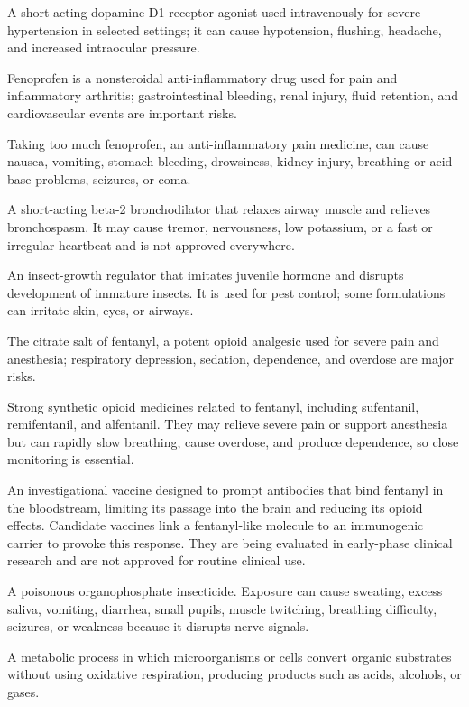  A short-acting dopamine D1-receptor agonist used intravenously for severe hypertension in selected settings; it can cause hypotension, flushing, headache, and increased intraocular pressure.

 Fenoprofen is a nonsteroidal anti-inflammatory drug used for pain and inflammatory arthritis; gastrointestinal bleeding, renal injury, fluid retention, and cardiovascular events are important risks.

 Taking too much fenoprofen, an anti-inflammatory pain medicine, can cause nausea, vomiting, stomach bleeding, drowsiness, kidney injury, breathing or acid-base problems, seizures, or coma.

 A short-acting beta-2 bronchodilator that relaxes airway muscle and relieves bronchospasm. It may cause tremor, nervousness, low potassium, or a fast or irregular heartbeat and is not approved everywhere.

 An insect-growth regulator that imitates juvenile hormone and disrupts development of immature insects. It is used for pest control; some formulations can irritate skin, eyes, or airways.

 The citrate salt of fentanyl, a potent opioid analgesic used for severe pain and anesthesia; respiratory depression, sedation, dependence, and overdose are major risks.

 Strong synthetic opioid medicines related to fentanyl, including sufentanil, remifentanil, and alfentanil. They may relieve severe pain or support anesthesia but can rapidly slow breathing, cause overdose, and produce dependence, so close monitoring is essential.

 An investigational vaccine designed to prompt antibodies that bind fentanyl in the bloodstream,
limiting its passage into the brain and reducing its opioid effects. Candidate vaccines link a fentanyl-like
molecule to an immunogenic carrier to provoke this response. They are being evaluated in early-phase
clinical research and are not approved for routine clinical use.

 A poisonous organophosphate insecticide. Exposure can cause sweating, excess saliva, vomiting, diarrhea, small pupils, muscle twitching, breathing difficulty, seizures, or weakness because it disrupts nerve signals.

 A metabolic process in which microorganisms or cells convert organic substrates without using oxidative respiration, producing products such as acids, alcohols, or gases.

